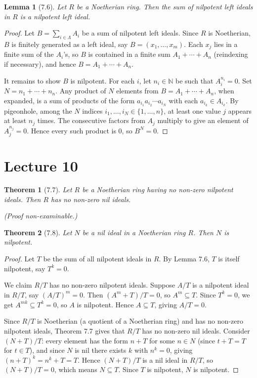 \documentclass[12pt]{article}
\newtheorem{theorem}{Theorem}
\newtheorem{lemma}{Lemma}
\begin{document}
\begin{lemma}[7.6]
Let $R$ be a Noetherian ring. Then the sum of nilpotent left ideals in $R$ is a nilpotent left ideal.
\end{lemma}

\begin{proof}
Let $B = \sum_{i \in \Lambda} A_i$ be a sum of nilpotent left ideals. Since $R$ is Noetherian, $B$ is finitely generated as a left ideal, say $B = (x_1, \ldots, x_m)$. Each $x_j$ lies in a finite sum of the $A_i$'s, so $B$ is contained in a finite sum $A_1 + \cdots + A_n$ (reindexing if necessary), and hence $B = A_1 + \cdots + A_n$.

It remains to show $B$ is nilpotent. For each $i$, let $n_i \in \mathbb{N}$ be such that $A_i^{n_i} = 0$. Set $N = n_1 + \cdots + n_n$. Any product of $N$ elements from $B = A_1 + \cdots + A_n$, when expanded, is a sum of products of the form $a_{i_1} a_{i_2} \cdots a_{i_N}$ with each $a_{i_k} \in A_{i_k}$. By pigeonhole, among the $N$ indices $i_1, \ldots, i_N \in \{1, \ldots, n\}$, at least one value $j$ appears at least $n_j$ times. The consecutive factors from $A_j$ multiply to give an element of $A_j^{n_j} = 0$. Hence every such product is $0$, so $B^N = 0$.
\end{proof}

\section*{Lecture 10}

\begin{theorem}[7.7]
Let $R$ be a Noetherian ring having no non-zero nilpotent ideals. Then $R$ has no non-zero nil ideals.
\end{theorem}

\noindent\textit{(Proof non-examinable.)}


\begin{theorem}[7.8]
Let $N$ be a nil ideal in a Noetherian ring $R$. Then $N$ is nilpotent.
\end{theorem}

\begin{proof}
Let $T$ be the sum of all nilpotent ideals in $R$. By Lemma 7.6, $T$ is itself nilpotent, say $T^k = 0$.

We claim $R/T$ has no non-zero nilpotent ideals. Suppose $A/T$ is a nilpotent ideal in $R/T$, say $(A/T)^m = 0$. Then $(A^m + T)/T = 0$, so $A^m \subseteq T$. Since $T^k = 0$, we get $A^{mk} \subseteq T^k = 0$, so $A$ is nilpotent. Hence $A \subseteq T$, giving $A/T = 0$.

Since $R/T$ is Noetherian (a quotient of a Noetherian ring) and has no non-zero nilpotent ideals, Theorem 7.7 gives that $R/T$ has no non-zero nil ideals. Consider $(N+T)/T$: every element has the form $n + T$ for some $n \in N$ (since $t + T = T$ for $t \in T$), and since $N$ is nil there exists $k$ with $n^k = 0$, giving $(n+T)^k = n^k + T = T$. Hence $(N+T)/T$ is a nil ideal in $R/T$, so $(N+T)/T = 0$, which means $N \subseteq T$. Since $T$ is nilpotent, $N$ is nilpotent.
\end{proof}
\end{document}
